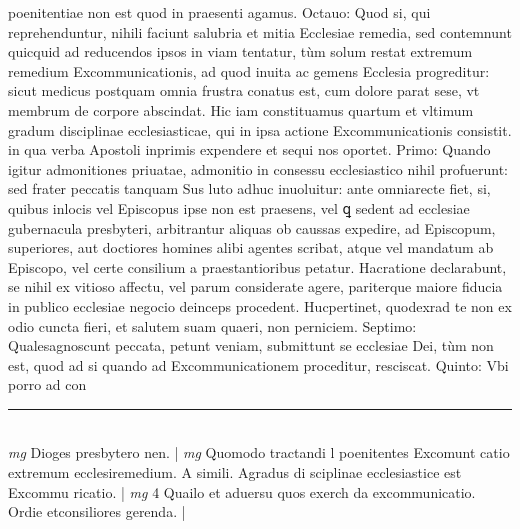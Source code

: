 \documentclass{article}
\begin{document}
\begin{pages}
poenitentiae non est quod in praesenti agamus. Octauo: Quod si, qui reprehenduntur, nihili faciunt salubria et mitia Ecclesiae remedia, sed contemnunt quicquid ad reducendos ipsos in viam tentatur, tùm solum restat extremum remedium Excommunicationis, ad quod inuita ac gemens Ecclesia progreditur: sicut medicus postquam omnia frustra conatus est, cum dolore parat sese, vt membrum de corpore abscindat. Hic iam constituamus quartum et vltimum gradum disciplinae ecclesiasticae, qui in ipsa actione Excommunicationis consistit. in qua verba Apostoli inprimis expendere et sequi nos oportet. Primo: Quando igitur admonitiones priuatae, admonitio in consessu ecclesiastico nihil profuerunt: sed frater peccatis tanquam Sus luto adhuc inuoluitur: ante omniarecte fiet, si, quibus inlocis vel Episcopus ipse non est praesens, vel ꝗ sedent ad ecclesiae gubernacula presbyteri, arbitrantur aliquas ob caussas expedire, ad Episcopum, superiores, aut doctiores homines alibi agentes scribat, atque  vel mandatum ab Episcopo, vel certe consilium a praestantioribus petatur. Hacratione declarabunt, se nihil ex vitioso affectu, vel parum considerate agere, pariterque  maiore fiducia in publico ecclesiae negocio deinceps procedent. Hucpertinet, quodexrad te non ex odio cuncta fieri, et salutem suam quaeri, non perniciem. Septimo: Qualesagnoscunt peccata, petunt veniam, submittunt se ecclesiae Dei, tùm non est, quod ad si quando ad Excommunicationem proceditur, resciscat. Quinto: Vbi porro ad con\pend
\vspace{0.5cm}\noindent
\vspace{0.2cm}\rule{1cm}{0.2pt}\\ 
\hspace{0.2cm}\textit{mg}
\footnotesize Dioges presbytero nen. 
\normalsize| 
\hspace{0.2cm}\textit{mg}
\footnotesize Quomodo tractandi l poenitentes Excomunt catio extremum ecclesiremedium. A simili. Agradus di sciplinae ecclesiastice est Excommu ricatio. 
\normalsize| 
\hspace{0.2cm}\textit{mg}
\footnotesize 4 Quailo et aduersu quos exerch da excommunicatio. Ordie etconsiliores gerenda. 
\normalsize| 

\end{pages}
\end{document}
